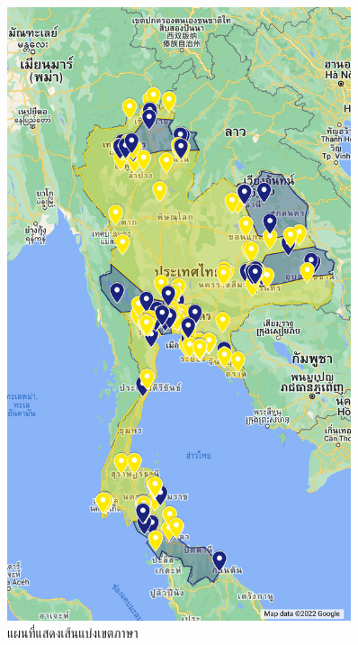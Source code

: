 \documentclass[a4paper]{article}
\begin{document}
\begin{figure}[!ht]
\begin{center}
        \begin{minipage}{0.45\textwidth}
            \includegraphics[width=0.9\textwidth]{map_with_dot.jpg}
        \end{minipage}
        \end{center}
        \caption{แผนที่แสดงเส้นแบ่งเขตภาษา}
    \end{figure}
\end{document}
